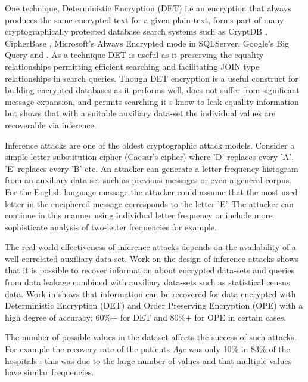 \documentclass[journal]{IEEEtran}
\begin{document}
One technique, Deterministic Encryption (DET) i.e an encryption that always produces the same encrypted text for a given plain-text, forms part of many cryptographically protected database search systems\cite{SOK2017} such as CryptDB \cite{Popa2011}, CipherBase \cite{cipherbase}, Microsoft's Always Encrypted mode in SQLServer\cite{AlwaysEncrypted}, Google's Big Query\cite{BigQuery} and \cite{Bellare2007}. As a technique DET is useful as it preserving the equality relationships permitting efficient searching and facilitating JOIN type relationships in search queries. Though DET encryption is a useful construct for building encrypted databases as it performs well, does not suffer from significant message expansion, and  permits searching it s know to leak equality information \cite{SOK2017} but \cite{InfrenceAttacks} shows that with a suitable auxiliary data-set the individual values are recoverable via inference. 

Inference attacks are one of the  oldest\cite{Arab} cryptographic attack models. Consider a simple letter substitution cipher (Caesar's cipher) where 'D' replaces every 'A', 'E' replaces every 'B' etc. An attacker can generate a letter frequency histogram from an auxiliary data-set such as previous messages or even a general corpus. For the English language message the attacker could assume that the most used letter in the enciphered message corresponds to the letter 'E'. The attacker can continue in this manner using individual letter frequency or include more sophisticate analysis of two-letter frequencies for example.

The real-world effectiveness of inference attacks depends on the availability of a well-correlated auxiliary data-set. Work\cite{Ismal2012} on the design of inference attacks  shows that it is possible to recover information about encrypted data-sets and queries from data leakage combined with auxiliary data-sets such as statistical census data. Work in \cite{InfrenceAttacks} shows that information can be recovered for data encrypted with Deterministic Encryption (DET) and Order Preserving Encryption (OPE) with a high degree of accuracy; 60\%+ for DET and 80\%+ for OPE in certain cases.

The number of possible values in the dataset affects the success of such attacks. For example the recovery rate of the patients \textit{ Age} was only 10\% in 83\% of the hospitals \cite{InfrenceAttacks}; this was due to the large number of values and that multiple values have similar frequencies.
\end{document}
